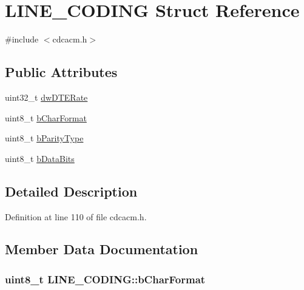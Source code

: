 \hypertarget{struct_l_i_n_e___c_o_d_i_n_g}{\section{\-L\-I\-N\-E\-\_\-\-C\-O\-D\-I\-N\-G \-Struct \-Reference}
\label{struct_l_i_n_e___c_o_d_i_n_g}
}


{\ttfamily \#include $<$cdcacm.\-h$>$}

\subsection*{\-Public \-Attributes}
\begin{DoxyCompactItemize}
\item 
uint32\-\_\-t \hyperlink{struct_l_i_n_e___c_o_d_i_n_g_ae9fd7d7247b4c50df89a6dd5ed955073}{dw\-D\-T\-E\-Rate}
\item 
uint8\-\_\-t \hyperlink{struct_l_i_n_e___c_o_d_i_n_g_ae2c35eef8f7e35b5f2a3464225477d3c}{b\-Char\-Format}
\item 
uint8\-\_\-t \hyperlink{struct_l_i_n_e___c_o_d_i_n_g_ad14985344c9e31a210999dfa0b4ccc42}{b\-Parity\-Type}
\item 
uint8\-\_\-t \hyperlink{struct_l_i_n_e___c_o_d_i_n_g_a2c360b6f874f2cf45f95492f9e6c1812}{b\-Data\-Bits}
\end{DoxyCompactItemize}


\subsection{\-Detailed \-Description}


\-Definition at line 110 of file cdcacm.\-h.



\subsection{\-Member \-Data \-Documentation}
\hypertarget{struct_l_i_n_e___c_o_d_i_n_g_ae2c35eef8f7e35b5f2a3464225477d3c}{
\subsubsection[{b\-Char\-Format}]{\setlength{\rightskip}{0pt plus 5cm}uint8\-\_\-t {\bf \-L\-I\-N\-E\-\_\-\-C\-O\-D\-I\-N\-G\-::b\-Char\-Format}}}\label{struct_l_i_n_e___c_o_d_i_n_g_ae2c35eef8f7e35b5f2a3464225477d3c}


